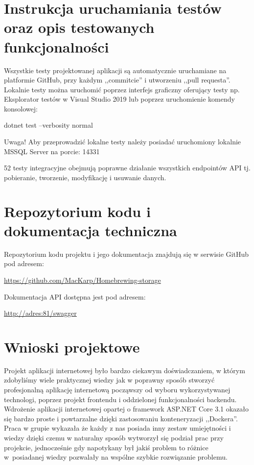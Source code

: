 \documentclass[12pt,a4paper]{article}
\begin{document}
	\section{Instrukcja uruchamiania testów oraz opis testowanych funkcjonalności}
		\indent Wszystkie testy projektowanej aplikacji są automatycznie uruchamiane na platformie GitHub, przy każdym ,,commitcie'' i utworzeniu ,,pull requesta''.
			Lokalnie testy można uruchomić poprzez interfejs graficzny oferujący testy np. Eksplorator testów w Visual Studio 2019 lub poprzez uruchomienie komendy konsolowej:
				\begin{tcolorbox}[minipage,colback=white,arc=0pt,outer arc=0pt, fontupper=\scriptsize]
					dotnet test --verbosity normal
				\end{tcolorbox}
				\begin{tcolorbox}[minipage,colback=white,arc=0pt,outer arc=0pt, fontupper=\scriptsize]
					Uwaga! Aby przeprowadzić lokalne testy należy posiadać uruchomiony lokalnie MSSQL Server na porcie: 14331
				\end{tcolorbox}
				 52 testy integracyjne obejmują poprawne działanie wszystkich endpointów API tj. pobieranie, tworzenie, modyfikację i usuwanie danych.     
	\newpage
	
	\section{Repozytorium kodu i dokumentacja techniczna}
		\indent Repozytorium kodu projektu i jego dokumentacja znajdują się w serwisie GitHub pod adresem: 
			\begin{tcolorbox}[minipage,colback=white,arc=0pt,outer arc=0pt, fontupper=\scriptsize]
				\url{https://github.com/MacKarp/Homebrewing-storage}
			\end{tcolorbox}
		\indent Dokumentacja API dostępna jest pod adresem:
			\begin{tcolorbox}[minipage,colback=white,arc=0pt,outer arc=0pt, fontupper=\scriptsize]
				\url{http://adres:81/swagger}
			\end{tcolorbox}
	\newpage
	
	\section{Wnioski projektowe}
		\indent Projekt aplikacji internetowej było bardzo ciekawym doświadczaniem, w którym zdobyliśmy wiele praktycznej wiedzy jak w poprawny sposób
			stworzyć profesjonalną aplikację internetową począwszy od wyboru wykorzystywanej technologi, poprzez projekt frontendu i oddzielonej funkcjonalności backendu.
			Wdrożenie aplikacji internetowej opartej o framework ASP.NET Core 3.1 okazało się bardzo proste i powtarzalne dzięki zastosowaniu konteneryzacji ,,Dockera''.
			Praca w grupie wykazała że każdy z nas posiada inny zestaw umiejętności i wiedzy dzięki czemu w naturalny sposób wytworzył się podział prac przy projekcie,
			jednocześnie gdy napotykany był jakiś problem to różnice w~posiadanej wiedzy pozwalały na wspólne szybkie rozwiązanie problemu. 
\end{document}
